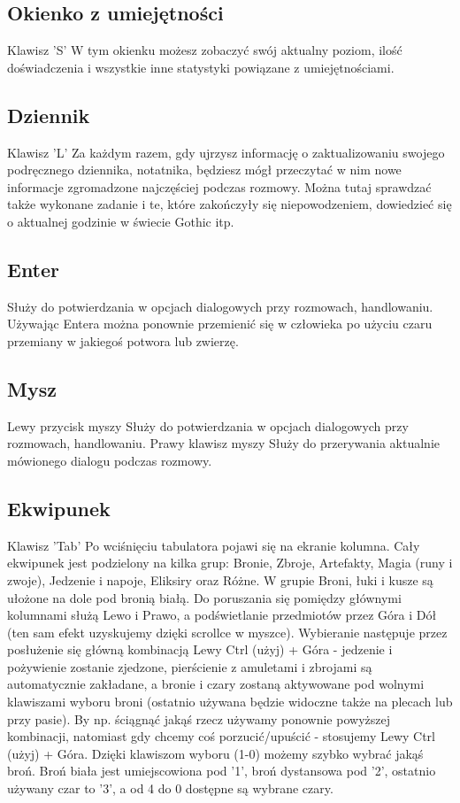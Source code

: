 \documentclass[11pt,polish, openany]{book}
\begin{document}
\subsection{Okienko z umiejętności}
Klawisz 'S'
W tym okienku możesz zobaczyć swój aktualny poziom, ilość doświadczenia i wszystkie inne statystyki powiązane z umiejętnościami.
\subsection{Dziennik}
Klawisz 'L'
Za każdym razem, gdy ujrzysz informację o zaktualizowaniu swojego podręcznego dziennika, notatnika, będziesz mógł przeczytać w nim nowe informacje zgromadzone najczęściej podczas rozmowy. Można tutaj sprawdzać także wykonane zadanie i te, które zakończyły się niepowodzeniem, dowiedzieć się o aktualnej godzinie w świecie Gothic itp.
\subsection{Enter}
Służy do potwierdzania w opcjach dialogowych przy rozmowach, handlowaniu. Używając Entera można ponownie przemienić się w człowieka po użyciu czaru przemiany w jakiegoś potwora lub zwierzę.
\subsection{Mysz}
Lewy przycisk myszy
Służy do potwierdzania w opcjach dialogowych przy rozmowach, handlowaniu.
Prawy klawisz myszy
Służy do przerywania aktualnie mówionego dialogu podczas rozmowy.
\subsection{Ekwipunek}
Klawisz 'Tab'
Po wciśnięciu tabulatora pojawi się na ekranie kolumna. Cały ekwipunek jest podzielony na kilka grup: Bronie, Zbroje, Artefakty, Magia (runy i zwoje), Jedzenie i napoje, Eliksiry oraz Różne. W grupie Broni, łuki i kusze są ułożone na dole pod bronią białą. Do poruszania się pomiędzy głównymi kolumnami służą Lewo i Prawo, a podświetlanie przedmiotów przez Góra i Dół (ten sam efekt uzyskujemy dzięki scrollce w myszce).
Wybieranie następuje przez posłużenie się główną kombinacją Lewy Ctrl (użyj) + Góra - jedzenie i pożywienie zostanie zjedzone, pierścienie z amuletami i zbrojami są automatycznie zakładane, a bronie i czary zostaną aktywowane pod wolnymi klawiszami wyboru broni (ostatnio używana będzie widoczne także na plecach lub przy pasie). By np. ściągnąć jakąś rzecz używamy ponownie powyższej kombinacji, natomiast gdy chcemy coś porzucić/upuścić - stosujemy Lewy Ctrl (użyj) + Góra.
Dzięki klawiszom wyboru (1-0) możemy szybko wybrać jakąś broń. Broń biała jest umiejscowiona pod '1', broń dystansowa pod '2', ostatnio używany czar to '3', a od 4 do 0 dostępne są wybrane czary.
\end{document}
